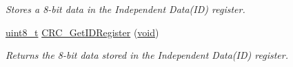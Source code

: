 \begin{DoxyCompactItemize}
\begin{DoxyCompactList}\small\item\em Stores a 8-\/bit data in the Independent Data(\+I\+D) register. \end{DoxyCompactList}\item 
\hyperlink{_p_e___types_8h_aba7bc1797add20fe3efdf37ced1182c5}{uint8\+\_\+t} \hyperlink{group___c_r_c___private___functions_gaf869f6e9c3ca0ae0822cfad1abea7e5f}{C\+R\+C\+\_\+\+Get\+I\+D\+Register} (\hyperlink{usb__devapi_8h_afabf60e7f57651d6d595a02c75f07cd0}{void})
\begin{DoxyCompactList}\small\item\em Returns the 8-\/bit data stored in the Independent Data(\+I\+D) register. \end{DoxyCompactList}\end{DoxyCompactItemize}
